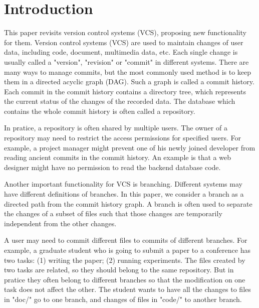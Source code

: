 \section{Introduction}
\label{s:intro}

This paper revisits version control systems
    (VCS), proposing new functionality for them.
Version control systems (VCS) are used to maintain changes of user data,
including code, document, multimedia data, etc.
Each single
change is usually called a "version", "revision" or "commit" in different
systems. There are many ways to manage commits, but the most commonly used
method is to keep them in a directed acyclic graph (DAG). Such a graph is called
a commit history. Each commit in the commit history contains a directory tree,
which represents the current status of the changes of the recorded data. The
database which contains the whole commit history is often called a repository.

In pratice, a repository is often shared by multiple users. The owner of a
repository may need to restrict the access permissions for specified users. For
example, a project manager might prevent one of his newly joined developer from
reading ancient commits in the commit history. An example is that a web designer
might have no permission to read the backend database code.

Another important functionality for VCS is branching. Different systems may have
different definitions of branches. In this paper, we consider a branch as a
directed path from the commit history graph. A branch is often used to separate
the changes of a subset of files such that those changes are temporarily
independent from the other changes.
\iffalse
It'd be better to communicate what is independent of what. Are you
saying that the new changes do not depend on the old, or vice-versa?
The problem with saying "X has a dependency" is that it is not clear
whether the writer means that X depends on something Y, or that
something Y depends on X.
\fi
A user may need to commit different files to commits of different
branches. For example, a graduate student who is going to submit a paper to a
conference has two tasks: (1) writing the paper; (2) running experiments. The
files created by two tasks are related, so they should belong to the same
repository. But in pratice they often belong to different branches so that the
modification on one task does not affect the other. The student wants to have
all the changes to files in "doc/" go to one branch, and changes of files in
"code/" to another branch.

